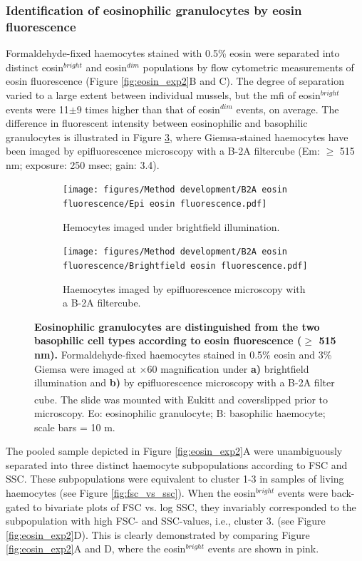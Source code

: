 \subsubsection{Identification of eosinophilic granulocytes by eosin fluorescence}
Formaldehyde-fixed haemocytes stained with 0.5\% eosin were separated into distinct eosin$^{bright}$ and eosin$^{dim}$ populations by flow cytometric measurements of eosin fluorescence (Figure \ref{fig:eosin_exp2}B and C). The degree of separation varied to a large extent between individual mussels, but the \acrshort{mfi} of eosin$^{bright}$ events were 11$\pm{9}$ times higher than that of eosin$^{dim}$ events, on average. The difference in fluorescent intensity between eosinophilic and basophilic granulocytes is illustrated in Figure \ref{fig:Eosin_fluorescence_B2A}, where Giemsa-stained haemocytes have been imaged by epifluorescence microscopy with a B-2A filtercube (Em: $\geq$ 515 nm; exposure: 250 msec; gain: 3.4).

\begin{figure}[H]
    \centering
    \begin{subfigure}[b]{.45\textwidth}
        \centering
        \texttt{[image: figures/Method development/B2A eosin fluorescence/Epi eosin fluorescence.pdf]}
        \caption{Hemocytes imaged under brightfield illumination.}
        \label{ffig:a}
    \end{subfigure}
    \hfill
    \begin{subfigure}[b]{.45\textwidth}
        \centering
        \texttt{[image: figures/Method development/B2A eosin fluorescence/Brightfield eosin fluorescence.pdf]}
        \caption{Haemocytes imaged by epifluorescence microscopy with a B-2A filtercube.}
        \label{ffig:b}
    \end{subfigure}
    \caption{\textbf{Eosinophilic granulocytes are distinguished from the two basophilic cell types according to eosin fluorescence ($\geq$ 515 nm).} Formaldehyde-fixed haemocytes stained in 0.5\% eosin and 3\% Giemsa were imaged at $\times$60 magnification under \textbf{a)} brightfield illumination and \textbf{b)} by epifluorescence microscopy with a B-2A filter cube. The slide was mounted with Eukitt\textsuperscript{\textregistered} and coverslipped prior to microscopy. Eo: eosinophilic granulocyte; B: basophilic haemocyte; scale bars = 10 \micro m. }
    \label{fig:Eosin_fluorescence_B2A}
\end{figure}

The pooled sample depicted in Figure \ref{fig:eosin_exp2}A were unambiguously separated into three distinct haemocyte subpopulations according to FSC and SSC. These subpopulations were equivalent to cluster 1-3 in samples of living haemocytes (see Figure \ref{fig:fsc_vs_ssc}). When the eosin$^{bright}$ events were back-gated to bivariate plots of FSC vs. log SSC, they invariably corresponded to the subpopulation with high FSC- and SSC-values, i.e., cluster 3. (see Figure \ref{fig:eosin_exp2}D). This is clearly demonstrated by comparing Figure \ref{fig:eosin_exp2}A and D, where the eosin$^{bright}$ events are shown in pink.

